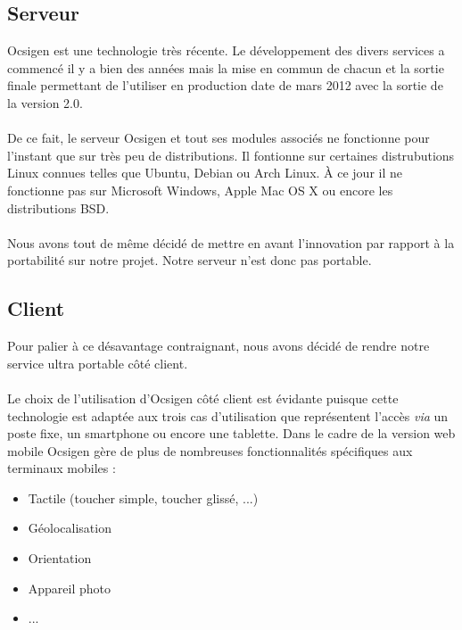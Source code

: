 \documentclass{life-fr}
\begin{document}
\subsection{Serveur}

Ocsigen est une technologie très récente. Le développement des divers services a
commencé il y a bien des années mais la mise en commun de chacun et la sortie
finale permettant de l'utiliser en production date de mars 2012 avec la sortie
de la version 2.0.\\
\\
De ce fait, le serveur Ocsigen et tout ses modules associés ne fonctionne
pour l'instant que sur très peu de distributions. Il fontionne sur certaines
distrubutions Linux connues telles que Ubuntu, Debian ou Arch Linux. À ce jour 
il ne fonctionne pas sur Microsoft Windows, Apple Mac OS X ou encore les 
distributions BSD.\\
\\
Nous avons tout de même décidé de mettre en avant l'innovation par rapport
à la portabilité sur notre projet. Notre serveur n'est donc pas portable.

\subsection{Client}

Pour palier à ce désavantage contraignant, nous avons décidé de rendre notre
service ultra portable côté client.\\
\\
Le choix de l'utilisation d'Ocsigen côté client est évidante puisque cette 
technologie est adaptée aux trois cas d'utilisation que représentent l'accès
\textit{via} un poste fixe, un smartphone ou encore une tablette. Dans le cadre
de la version web mobile Ocsigen  gère de plus de nombreuses fonctionnalités 
spécifiques aux terminaux mobiles :
\begin{itemize}
  \item Tactile (toucher simple, toucher glissé, ...)
  \item Géolocalisation
  \item Orientation
  \item Appareil photo
  \item ...
\end{itemize}
\end{document}
